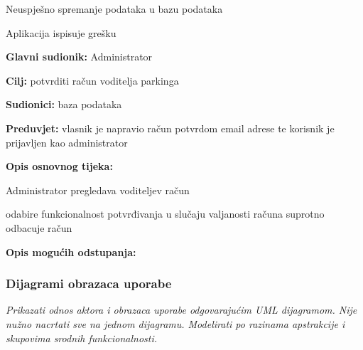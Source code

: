 \begin{packed_item}
\begin{packed_item}
\begin{packed_item}
    					\item[2.a] Neuspješno spremanje podataka u bazu podataka	
    					\item[] \begin{packed_enum}
    						
    						\item Aplikacija ispisuje grešku
    						
    					\end{packed_enum}
    						
    					\end{packed_item}
    				\end{packed_item}
    				\noindent {}
    				\begin{packed_item}
    					
    					\item \textbf{Glavni sudionik: } Administrator
    					\item  \textbf{Cilj:} potvrditi račun voditelja parkinga
    					\item  \textbf{Sudionici:}  baza podataka
    					\item  \textbf{Preduvjet:} vlasnik je napravio račun potvrdom email adrese te korisnik je prijavljen kao administrator
    					\item  \textbf{Opis osnovnog tijeka:}
    					
    					\item[] \begin{packed_enum}
    						
    						\item Administrator pregledava voditeljev račun
    						\item odabire funkcionalnost potvrđivanja u slučaju valjanosti računa suprotno odbacuje račun

    					\end{packed_enum}
    					
    					\item  \textbf{Opis mogućih odstupanja:}
    					
    					
    				\end{packed_item}
    				
				
					
				\subsubsection{Dijagrami obrazaca uporabe}
					
					\textit{Prikazati odnos aktora i obrazaca uporabe odgovarajućim UML dijagramom. Nije nužno nacrtati sve na jednom dijagramu. Modelirati po razinama apstrakcije i skupovima srodnih funkcionalnosti.}
				\eject		
				

\end{packed_item}
